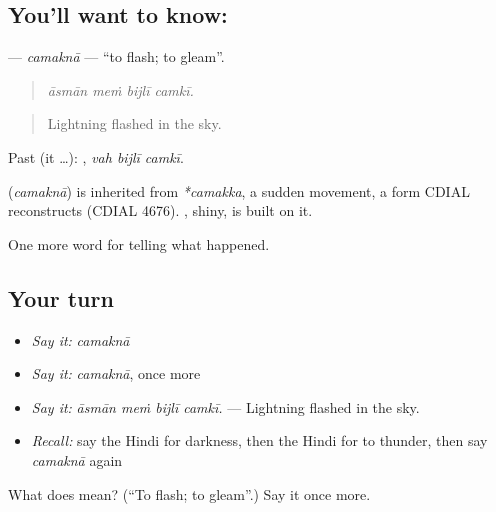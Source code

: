 \subsection*{You'll want to know: }
\textbf{} — \emph{camaknā} — \textquotedblleft{}to flash; to gleam\textquotedblright{}.

\begin{quote}
   
\end{quote}

\begin{quote}
\emph{āsmān meṁ bijlī camkī.}
\end{quote}

\begin{quote}
Lightning flashed in the sky.
\end{quote}

Past (it …):   , \emph{vah bijlī camkī}.

\begin{cousinweb}
\textbf{} (\emph{camaknā}) is inherited from \emph{*camakka}, a sudden movement, a form CDIAL reconstructs (CDIAL 4676). \textbf{}, shiny, is built on it.
\end{cousinweb}

\begin{grammarlens}[title={What you've built}]
One more word for telling what happened.
\end{grammarlens}

\subsection*{Your turn}
\begin{itemize}
\raggedright
  \item \emph{Say it:} \emph{camaknā}
  \item \emph{Say it:} \emph{camaknā}, once more
  \item \emph{Say it:} \emph{āsmān meṁ bijlī camkī.} — Lightning flashed in the sky.
  \item \emph{Recall:} say the Hindi for darkness, then the Hindi for to thunder, then say \emph{camaknā} again
\end{itemize}

\begin{tcolorbox}[breakable,colback=teal!4,colframe=teal!35!black,title={Before you move on}]
What does  mean? (\textquotedblleft{}To flash; to gleam\textquotedblright{}.) Say it once more.
\end{tcolorbox}
